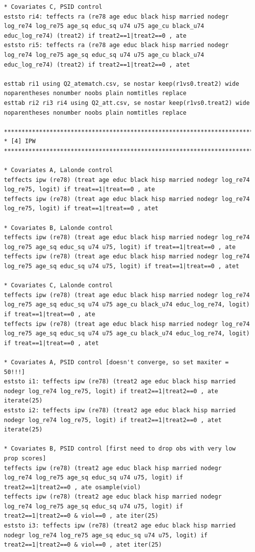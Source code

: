 \documentclass[12pt]{article}
\begin{document}
\begin{verbatim}
* Covariates C, PSID control
eststo ri4: teffects ra (re78 age educ black hisp married nodegr log_re74 log_re75 age_sq educ_sq u74 u75 age_cu black_u74 educ_log_re74) (treat2) if treat2==1|treat2==0 , ate 
eststo ri5: teffects ra (re78 age educ black hisp married nodegr log_re74 log_re75 age_sq educ_sq u74 u75 age_cu black_u74 educ_log_re74) (treat2) if treat2==1|treat2==0 , atet 

esttab ri1 using Q2_atematch.csv, se nostar keep(r1vs0.treat2) wide noparentheses nonumber noobs plain nomtitles replace
esttab ri2 ri3 ri4 using Q2_att.csv, se nostar keep(r1vs0.treat2) wide noparentheses nonumber noobs plain nomtitles replace

********************************************************************************
* [4] IPW
********************************************************************************

* Covariates A, Lalonde control
teffects ipw (re78) (treat age educ black hisp married nodegr log_re74 log_re75, logit) if treat==1|treat==0 , ate 
teffects ipw (re78) (treat age educ black hisp married nodegr log_re74 log_re75, logit) if treat==1|treat==0 , atet 

* Covariates B, Lalonde control
teffects ipw (re78) (treat age educ black hisp married nodegr log_re74 log_re75 age_sq educ_sq u74 u75, logit) if treat==1|treat==0 , ate 
teffects ipw (re78) (treat age educ black hisp married nodegr log_re74 log_re75 age_sq educ_sq u74 u75, logit) if treat==1|treat==0 , atet

* Covariates C, Lalonde control
teffects ipw (re78) (treat age educ black hisp married nodegr log_re74 log_re75 age_sq educ_sq u74 u75 age_cu black_u74 educ_log_re74, logit) if treat==1|treat==0 , ate 
teffects ipw (re78) (treat age educ black hisp married nodegr log_re74 log_re75 age_sq educ_sq u74 u75 age_cu black_u74 educ_log_re74, logit) if treat==1|treat==0 , atet 

* Covariates A, PSID control [doesn't converge, so set maxiter = 50!!!]
eststo i1: teffects ipw (re78) (treat2 age educ black hisp married nodegr log_re74 log_re75, logit) if treat2==1|treat2==0 , ate iterate(25)
eststo i2: teffects ipw (re78) (treat2 age educ black hisp married nodegr log_re74 log_re75, logit) if treat2==1|treat2==0 , atet iterate(25)

* Covariates B, PSID control [first need to drop obs with very low prop scores]
teffects ipw (re78) (treat2 age educ black hisp married nodegr log_re74 log_re75 age_sq educ_sq u74 u75, logit) if treat2==1|treat2==0 , ate osample(viol)
teffects ipw (re78) (treat2 age educ black hisp married nodegr log_re74 log_re75 age_sq educ_sq u74 u75, logit) if treat2==1|treat2==0 & viol==0 , ate iter(25)
eststo i3: teffects ipw (re78) (treat2 age educ black hisp married nodegr log_re74 log_re75 age_sq educ_sq u74 u75, logit) if treat2==1|treat2==0 & viol==0 , atet iter(25)


\end{verbatim}
\end{document}
